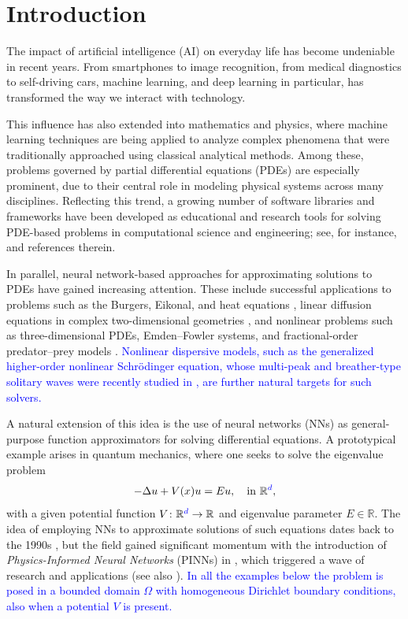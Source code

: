 \documentclass[10pt]{amsart}
\newcommand{\rev}[1]{\textcolor{blue}{#1}}
\theoremstyle{definition}
\theoremstyle{remark}
\theoremstyle{plain}
\newcommand{\R}{\mathbb{R}}
\begin{document}
\maketitle

\section{Introduction}

The impact of artificial intelligence (AI) on everyday life has become undeniable in recent years. From smartphones to image recognition, from medical diagnostics to self-driving cars, machine learning, and deep learning in particular, has transformed the way we interact with technology.

This influence has also extended into mathematics and physics, where machine learning techniques are being applied to analyze complex phenomena that were traditionally approached using classical analytical methods. Among these, problems governed by partial differential equations (PDEs) are especially prominent, due to their central role in modeling physical systems across many disciplines. Reflecting this trend, a growing number of software libraries and frameworks have been developed as educational and research tools for solving PDE-based problems in computational science and engineering; see, for instance, \cite{Lu-Meng-Mao, Rackauckas, Rackauckas-Innes-Ma-Bettencourt-etal} and references therein.

In parallel, neural network-based approaches for approximating solutions to PDEs have gained
increasing attention. These include successful applications to problems such as the Burgers,
Eikonal, and heat equations \cite{Blechschmidt-Ernst}, linear diffusion equations in complex
two-dimensional geometries \cite{Berg-Nystrom}, and nonlinear problems such as three-dimensional
PDEs, Emden--Fowler systems, and fractional-order predator--prey models \cite{GT24, KKG, MHO}.
\rev{Nonlinear dispersive models, such as the generalized higher-order nonlinear Schr\"odinger
equation, whose multi-peak and breather-type solitary waves were recently studied in
\cite{Yasin-etal}, are further natural targets for such solvers.}

A natural extension of this idea is the use of neural networks (NNs) as general-purpose function approximators for solving differential equations. A prototypical example arises in quantum mechanics, where one seeks to solve the eigenvalue problem
\begin{equation}\label{eigen}
-\Delta u + V(x) u = E u,\quad \text{in } \R^{\rev{d}},
\end{equation}
with a given potential function \( V \colon \R^{\rev{d}} \to \R \) and eigenvalue parameter \( E \in \R \). The idea of employing NNs to approximate solutions of such equations dates back to the 1990s \cite{Lagaris-Likas-Fotiadis}, but the field gained significant momentum with the introduction of {\em Physics-Informed Neural Networks} (PINNs) in \cite{Raissi-Perdiakaris-Karniadakis}, which triggered a wave of research and applications (see also \cite{Karniadakis-etal}).
\rev{In all the examples below the problem is posed in a bounded domain $\Omega$ with homogeneous
Dirichlet boundary conditions, also when a potential $V$ is present.}
\end{document}
